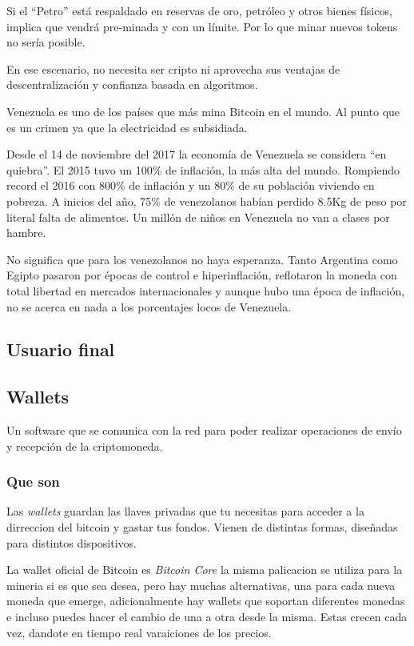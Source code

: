 \documentclass[12pt,letterpaper]{article}
\begin{document}
Si el “Petro” está respaldado en reservas de oro, petróleo y otros bienes físicos, implica que vendrá pre-minada y con un límite. Por lo que minar nuevos tokens no sería posible.

En ese escenario, no necesita ser cripto ni aprovecha sus ventajas de descentralización y confianza basada en algoritmos. 

Venezuela es uno de los países que más mina Bitcoin en el mundo. Al punto que es un crimen ya que la electricidad es subsidiada.

Desde el 14 de noviembre del 2017 la economía de Venezuela se considera “en quiebra”. El 2015 tuvo un 100\% de inflación, la más alta del mundo. Rompiendo record el 2016 con 800\% de inflación y un 80\% de su población viviendo en pobreza. A inicios del año, 75\% de venezolanos habían perdido 8.5Kg de peso por literal falta de alimentos. Un millón de niños en Venezuela no van a clases por hambre.

No significa que para los venezolanos no haya esperanza. Tanto Argentina como Egipto pasaron por épocas de control e hiperinflación, reflotaron la moneda con total libertad en mercados internacionales y aunque hubo una época de inflación, no se acerca en nada a los porcentajes locos de Venezuela.
        \subsection*{Usuario final}

            \subsection*{Wallets}
Un software que se comunica con la red para poder realizar operaciones de env\'io y recepci\'on de la criptomoneda.
                \subsubsection*{Que son}
                Las \textit{wallets} guardan las llaves privadas que tu necesitas para acceder a la dirreccion del bitcoin y gastar tus fondos. Vienen de distintas formas, dise\~nadas para distintos dispositivos.
                
                La wallet oficial de Bitcoin es \textit{Bitcoin Core} la misma palicacion se utiliza para la mineria si es que sea desea, pero hay muchas alternativas, una para cada nueva moneda que emerge, adicionalmente hay wallets que soportan diferentes monedas e incluso puedes hacer el cambio de una a otra desde la misma. Estas crecen cada vez, dandote en tiempo real varaiciones de los precios.
\end{document}

